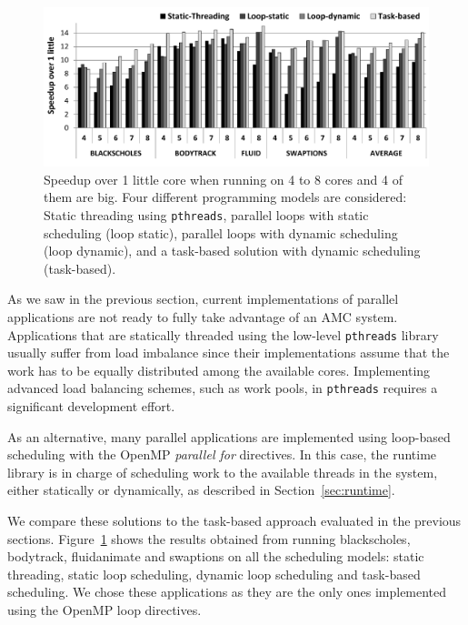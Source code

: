 \begin{figure}
        \centering
        \includegraphics[width=\columnwidth]{figures/speedup-ompssVSopenmp_new}
        \vspace{-0.5cm}
        \caption{Speedup over 1 little core when running on 4 to 8 cores and 4 of them are big. 
Four different programming models are considered: Static threading using \texttt{pthreads}, 
parallel loops with static scheduling (loop static), parallel loops with dynamic scheduling (loop 
dynamic), and a task-based solution with dynamic scheduling (task-based).}%
        \label{fig:prog_models}%
\end{figure}

As we saw in the previous section, current implementations of parallel applications are not ready to fully take advantage of an AMC system.
Applications that are statically threaded using the low-level \texttt{pthreads} library usually suffer from load imbalance since their implementations assume that the work has to be equally distributed among the available cores. 
Implementing advanced load balancing schemes, such as
work pools, in \texttt{pthreads} requires a significant development effort.

As an alternative, many parallel applications are implemented using loop-based scheduling with the 
OpenMP \emph{parallel for} directives. 
In this case, the runtime library is in charge of scheduling work to the available threads in the system, either statically or dynamically, as described in Section~\ref{sec:runtime}.

We compare these solutions to the task-based approach evaluated in the previous sections. 
Figure~\ref{fig:prog_models} shows the results obtained from running blackscholes, bodytrack, fluidanimate and swaptions on all the scheduling models: static threading, static loop scheduling, dynamic loop scheduling and task-based scheduling. 
We chose these applications as they are the only ones implemented using the OpenMP loop directives.

